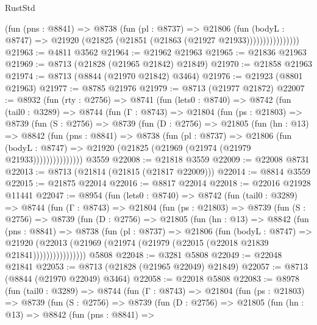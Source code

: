 \begin{lexlean}{RustStd}
\begin{coremodule}
                      (fun (pns : @8841) =>
                      @8738
                        (fun (pl : @8737) =>
                        @21806
                          (fun (bodyL : @8747) =>
                          @21920 (@21825 (@21851 (@21863 (@21927 @21933))))))))))))))))
@21963 := @4811 @3562
@21964 := @21962 @21963
@21965 := @21836 @21963
@21969 := @8713 (@21828 (@21965 @21842) @21849)
@21970 := @21858 @21963
@21974 := @8713 (@8844 (@21970 @21842) @3464)
@21976 := @21923 (@8801 @21963)
@21977 := @8785 @21976
@21979 := @8713 (@21977 @21872)
@22007 := @8932
    (fun (rty : @2756) =>
    @8741
      (fun (lets0 : @8740) =>
      @8742
        (fun (tail0 : @3289) =>
        @8744
          (fun (Γ : @8743) =>
          @21804
            (fun (ps : @21803) =>
            @8739
              (fun (S : @2756) =>
              @8739
                (fun (D : @2756) =>
                @21805
                  (fun (hn : @13) =>
                  @8842
                    (fun (pns : @8841) =>
                    @8738
                      (fun (pl : @8737) =>
                      @21806
                        (fun (bodyL : @8747) =>
                        @21920 (@21825 (@21969 (@21974 (@21979 @21933)))))))))))))))
    @3559
@22008 := @21818 @3559
@22009 := @22008 @8731
@22013 := @8713 (@21814 (@21815 (@21817 @22009)))
@22014 := @8814 @3559
@22015 := @21875 @22014
@22016 := @8817 @22014
@22018 := @22016 @21928 @11441
@22047 := @8954
    (fun (lets0 : @8740) =>
    @8742
      (fun (tail0 : @3289) =>
      @8744
        (fun (Γ : @8743) =>
        @21804
          (fun (ps : @21803) =>
          @8739
            (fun (S : @2756) =>
            @8739
              (fun (D : @2756) =>
              @21805
                (fun (hn : @13) =>
                @8842
                  (fun (pns : @8841) =>
                  @8738
                    (fun (pl : @8737) =>
                    @21806
                      (fun (bodyL : @8747) =>
                      @21920
                        (@22013
                          (@21969 (@21974 (@21979 (@22015 (@22018 @21839 @21841))))))))))))))))
    @5808
@22048 := @3281 @5808
@22049 := @22048 @21841
@22053 := @8713 (@21828 (@21965 @22049) @21849)
@22057 := @8713 (@8844 (@21970 @22049) @3464)
@22058 := @22018 @5808
@22083 := @8978
    (fun (tail0 : @3289) =>
    @8744
      (fun (Γ : @8743) =>
      @21804
        (fun (ps : @21803) =>
        @8739
          (fun (S : @2756) =>
          @8739
            (fun (D : @2756) =>
            @21805
              (fun (hn : @13) =>
              @8842
                (fun (pns : @8841) =>

\end{coremodule}
\end{lexlean}
